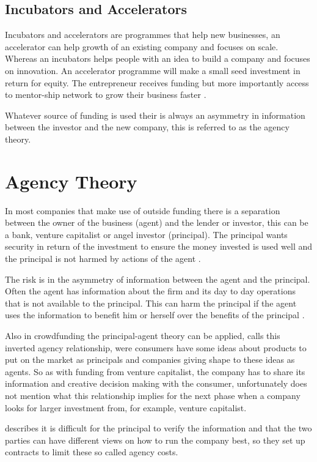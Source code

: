 \documentclass[a4paper, 11pt]{article}
\begin{document}
\subsection{Incubators and Accelerators}
Incubators and accelerators are programmes that help new businesses, an accelerator can help growth of an existing company and focuses on scale. Whereas an incubators helps people with an idea to build a company and focuses on innovation. An accelerator programme will make a small seed investment in return for equity. The entrepreneur receives funding but more importantly access to mentor-ship network to grow their business faster \citep{forrest}.

Whatever source of funding is used their is always an asymmetry in information between the investor and the new company, this is referred to as the agency theory.

\section{Agency Theory}

In most companies that make use of outside funding there is a separation between
the owner of the business (agent) and the lender or investor, this can be a
bank, venture capitalist or angel investor (principal). The principal wants
security in return of the investment to ensure the money invested is used well
and the principal is not harmed by actions of the agent \citep{jensen1976theory}.

The risk is in the asymmetry of information between the agent and the principal. Often the
agent has information about the firm and its day to day operations that is not
available to the principal. This can harm the principal if the agent uses the
information to benefit him or herself over the benefits of the principal
\citep{Osnabrugge2000}.


Also in crowdfunding the principal-agent theory can be applied, \cite{chaney} calls this inverted agency relationship, were consumers have some ideas about products to put on the market as principals and companies giving shape to these ideas as agents. So as with funding from venture capitalist, the company has to share its information and creative decision making with the consumer, unfortunately \cite{chaney} does not mention what this relationship implies for the next phase when a company looks for larger investment from, for example, venture capitalist. 

\cite{Osnabrugge2000} describes it is difficult for the principal to verify the information and that the two parties can have different views on how to run the company best, so they set up contracts to limit these so called agency costs.
\end{document}
